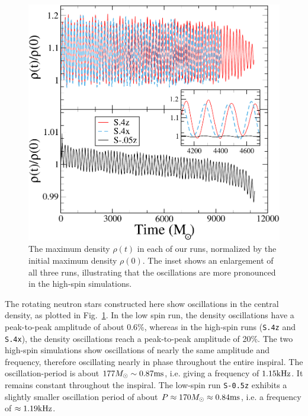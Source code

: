 {\begin{figure}
\includegraphics[width=0.95\columnwidth]{chap2/RhoMax}
\caption[The normalized maximum density in each of our runs.]{\label{fig:RhoMax} The maximum density $\rho(t)$ in each of
  our runs, normalized by the initial maximum density $\rho(0)$.  The
  inset shows an enlargement of all three runs, illustrating that the
  oscillations are more pronounced in the high-spin simulations. }
\end{figure}

The rotating neutron stars constructed here show oscillations in the
central density, as plotted in Fig.~\ref{fig:RhoMax}.  In the low spin
run, the density oscillations have a peak-to-peak amplitude of about
0.6\%, whereas in the high-spin runs ({\tt S.4z} and {\tt S.4x}), the density
oscillations reach a peak-to-peak amplitude of 20\%.  The two
high-spin simulations show oscillations of nearly the same amplitude
and frequency, therefore oscillating nearly in phase throughout the
entire inspiral.  The oscillation-period is about
$177 M_{\odot} \sim 0.87\rm{ms}$, i.e. giving a frequency of
$1.15{\rm kHz}$.  It remains constant throughout the inspiral.  The low-spin
run {\tt S-0.5z} exhibits a slightly smaller oscillation period of about
$P\approx 170M_{\odot}\approx 0.84\rm{ms}$, i.e. a frequency of
$\approx 1.19{\rm kHz}$.  


}
